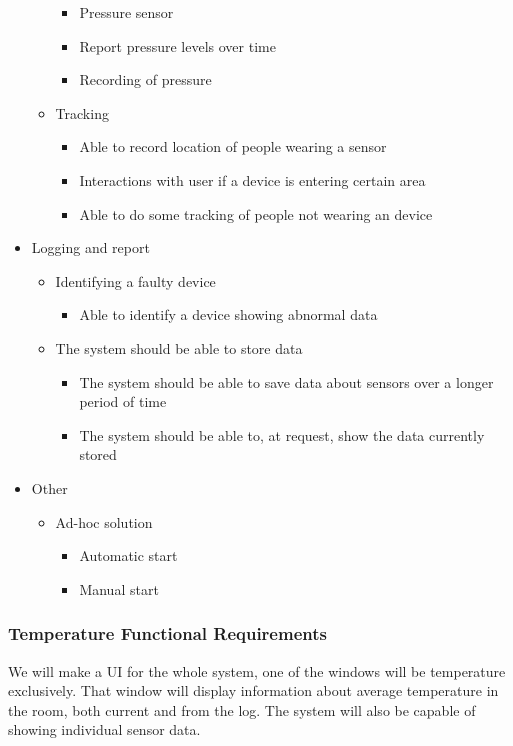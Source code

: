 \documentclass[../document]{subfiles}
\begin{document}
\begin{itemize}
\begin{itemize}
\begin{itemize}
			\item
			Pressure sensor
			\item
			Report pressure levels over time
			\item
			Recording of pressure
		\end{itemize}
		\item
		Tracking
		\begin{itemize}
			\item
			Able to record location of people wearing a sensor
			\item
			Interactions with user if a device is entering certain area
			\item
			Able to do some tracking of people not wearing an device
		\end{itemize}
	\end{itemize}
	\item
	Logging and report
	\begin{itemize}
		\item
		Identifying a faulty device
		\begin{itemize}
			\item
			Able to identify a device showing abnormal data
		\end{itemize}
		\item
		The system should be able to store data
		\begin{itemize}
			\item
			The system should be able to save data about sensors over a longer period of time
			\item
			The system should be able to, at request, show the data currently stored
		\end{itemize}
	\end{itemize}
	\item
	Other
	\begin{itemize}
		\item
		Ad-hoc solution
		\begin{itemize}
			\item
			Automatic start
			\item
			Manual start
		\end{itemize}
	\end{itemize}
\end{itemize}

\subsubsection{Temperature Functional Requirements}
We will make a UI for the whole system, one of the windows will be temperature exclusively. That window will display information about average temperature in the room, both current and from the log. The system will also be capable of showing individual sensor data.
\end{document}
